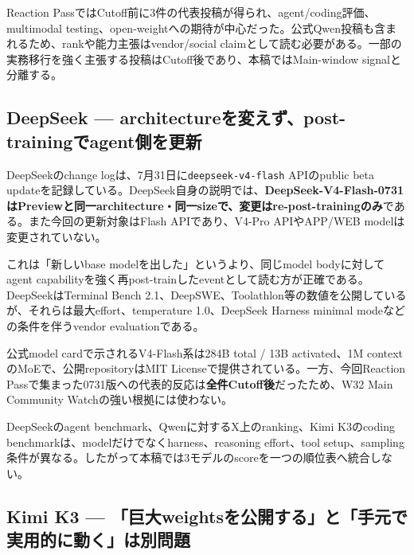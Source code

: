 \begin{communitynote}
Reaction PassではCutoff前に3件の代表投稿が得られ、agent/coding評価、multimodal testing、open-weightへの期待が中心だった。公式Qwen投稿も含まれるため、rankや能力主張はvendor/social claimとして読む必要がある\cite{qwen38-x-ranking}。一部の実務移行を強く主張する投稿はCutoff後であり、本稿ではMain-window signalと分離する。
\end{communitynote}

\subsection*{DeepSeek --- architectureを変えず、post-trainingでagent側を更新}

DeepSeekのchange logは、7月31日に\texttt{deepseek-v4-flash} APIのpublic beta updateを記録している。DeepSeek自身の説明では、\textbf{DeepSeek-V4-Flash-0731はPreviewと同一architecture・同一sizeで、変更はre-post-trainingのみ}である。また今回の更新対象はFlash APIであり、V4-Pro APIやAPP/WEB modelは変更されていない\cite{deepseek-v4-flash-0731}。

これは「新しいbase modelを出した」というより、同じmodel bodyに対してagent capabilityを強く再post-trainしたeventとして読む方が正確である。DeepSeekはTerminal Bench 2.1、DeepSWE、Toolathlon等の数値を公開しているが、それらは最大effort、temperature 1.0、DeepSeek Harness minimal modeなどの条件を伴うvendor evaluationである\cite{deepseek-v4-flash-0731}。

公式model cardで示されるV4-Flash系は284B total / 13B activated、1M contextのMoEで、公開repositoryはMIT Licenseで提供されている\cite{deepseek-v4-flash-hf}。一方、今回Reaction Passで集まった0731版への代表的反応は\textbf{全件Cutoff後}だったため、W32 Main Community Watchの強い根拠には使わない。

\begin{claimboundary}[同じbenchmark名でもharnessが違えば単純比較できない]
DeepSeekのagent benchmark、Qwenに対するX上のranking、Kimi K3のcoding benchmarkは、modelだけでなくharness、reasoning effort、tool setup、sampling条件が異なる。したがって本稿では3モデルのscoreを一つの順位表へ統合しない。
\end{claimboundary}

\subsection*{Kimi K3 --- 「巨大weightsを公開する」と「手元で実用的に動く」は別問題}

